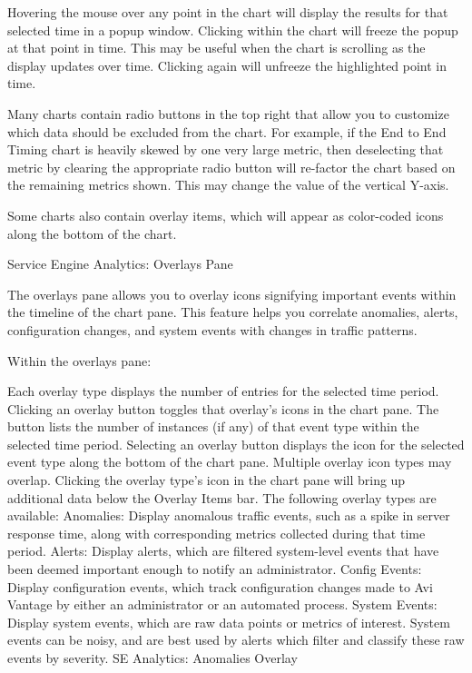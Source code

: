 \documentclass[letterpaper,10pt,english]{sphinxmanual}
\begin{document}
Hovering the mouse over any point in the chart will display the results for that selected time in a popup window.
Clicking within the chart will freeze the popup at that point in time. This may be useful when the chart is scrolling as the display updates over time.
Clicking again will unfreeze the highlighted point in time.

Many charts contain radio buttons in the top right that allow you to customize which data should be excluded from the chart. For example, if the End to End Timing chart is heavily skewed by one very large metric, then deselecting that metric by clearing the appropriate radio button will re-factor the chart based on the remaining metrics shown. This may change the value of the vertical Y-axis.

Some charts also contain overlay items, which will appear as color-coded icons along the bottom of the chart.

Service Engine Analytics: Overlays Pane

The overlays pane allows you to overlay icons signifying important events within the timeline of the chart pane. This feature helps you correlate anomalies, alerts, configuration changes, and system events with changes in traffic patterns.

Within the overlays pane:

Each overlay type displays the number of entries for the selected time period.
Clicking an overlay button toggles that overlay's icons in the chart pane. The button lists the number of instances (if any) of that event type within the selected time period.
Selecting an overlay button displays the icon for the selected event type along the bottom of the chart pane. Multiple overlay icon types may overlap. Clicking the overlay type's icon in the chart pane will bring up additional data below the Overlay Items bar. The following overlay types are available:
Anomalies: Display anomalous traffic events, such as a spike in server response time, along with corresponding metrics collected during that time period.
Alerts: Display alerts, which are filtered system-level events that have been deemed important enough to notify an administrator.
Config Events: Display configuration events, which track configuration changes made to Avi Vantage by either an administrator or an automated process.
System Events: Display system events, which are raw data points or metrics of interest. System events can be noisy, and are best used by alerts which filter and classify these raw events by severity.
SE Analytics: Anomalies Overlay
\end{document}
